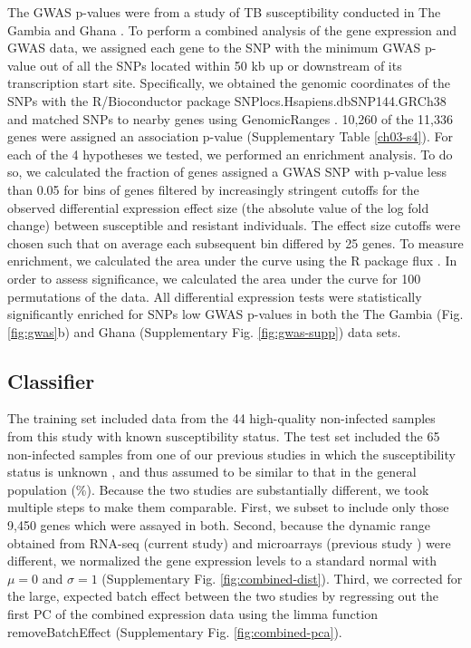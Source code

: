 The GWAS p-values were from a study of TB susceptibility conducted in
The Gambia and Ghana \citep{Thye2010}. To perform a combined analysis
of the gene expression and GWAS data, we assigned each gene to the SNP
with the minimum GWAS p-value out of all the SNPs located within 50 kb
up or downstream of its transcription start site. Specifically, we
obtained the genomic coordinates of the SNPs with the R/Bioconductor
\citep{Huber2015} package SNPlocs.Hsapiens.dbSNP144.GRCh38 and matched
SNPs to nearby genes using GenomicRanges \citep{Lawrence2013}. 10,260
of the 11,336 genes were assigned an association p-value
(Supplementary Table \ref{ch03-s4}). For each of the 4 hypotheses we tested, we
performed an enrichment analysis. To do so, we calculated the fraction
of genes assigned a GWAS SNP with p-value less than 0.05 for bins of
genes filtered by increasingly stringent cutoffs for the observed
differential expression effect size (the absolute value of the log
fold change) between susceptible and resistant individuals. The effect
size cutoffs were chosen such that on average each subsequent bin
differed by 25 genes. To measure enrichment, we calculated the area
under the curve using the R package flux \citep{Jurasinski2014}. In
order to assess significance, we calculated the area under the curve
for 100 permutations of the data. All differential expression tests
were statistically significantly enriched for SNPs low GWAS p-values
in both the The Gambia (Fig. \ref{fig:gwas}b) and Ghana (Supplementary
Fig. \ref{fig:gwas-supp}) data sets.
\subsection{Classifier}

The training set included data from the 44 high-quality non-infected
samples from this study with known susceptibility status. The test set
included the 65 non-infected samples from one of our previous studies
in which the susceptibility status is unknown \citep{Barreiro2012}, and
thus assumed to be similar to that in the general population
(\%). Because the two studies are substantially
different, we took multiple steps to make them comparable. First, we
subset to include only those 9,450 genes which were assayed in both.
Second, because the dynamic range obtained from RNA-seq (current
study) and microarrays (previous study \citep{Barreiro2012}) were
different, we normalized the gene expression levels to a standard
normal with $\mu = 0$ and $\sigma = 1$ (Supplementary Fig.
\ref{fig:combined-dist}). Third, we corrected for the large, expected
batch effect between the two studies by regressing out the first PC of
the combined expression data using the limma function
removeBatchEffect \citep{Ritchie2015} (Supplementary Fig.
\ref{fig:combined-pca}).

